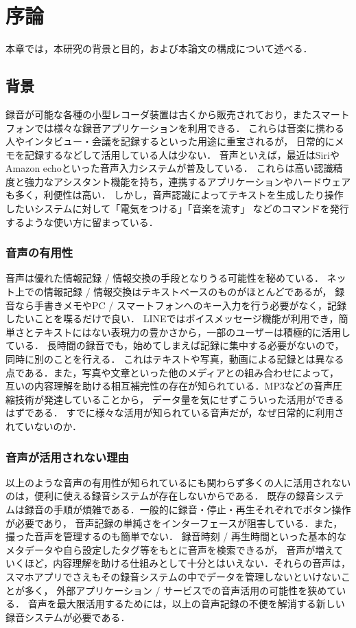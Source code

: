 \chapter{序論}
\label{chap:introduction}

本章では，本研究の背景と目的，および本論文の構成について述べる．

\newpage

\section{背景}

録音が可能な各種の小型レコーダ装置は古くから販売されており，またスマートフォンでは様々な録音アプリケーションを利用できる．
これらは音楽に携わる人やインタビュー・会議を記録するといった用途に重宝されるが，
日常的にメモを記録するなどして活用している人は少ない．
音声といえば，最近はSiriやAmazon echoといった音声入力システムが普及している．
これらは高い認識精度と強力なアシスタント機能を持ち，連携するアプリケーションやハードウェアも多く，利便性は高い．
しかし，音声認識によってテキストを生成したり操作したいシステムに対して「電気をつける」「音楽を流す」
などのコマンドを発行するような使い方に留まっている．

\subsection{音声の有用性}

音声は優れた情報記録 / 情報交換の手段となりうる可能性を秘めている．
ネット上での情報記録 / 情報交換はテキストベースのものがほとんどであるが，
録音なら手書きメモやPC / スマートフォンへのキー入力を行う必要がなく，記録したいことを喋るだけで良い．
LINEではボイスメッセージ機能が利用でき，簡単さとテキストにはない表現力の豊かさから，一部のユーザーは積極的に活用している．
長時間の録音でも，始めてしまえば記録に集中する必要がないので，同時に別のことを行える．
これはテキストや写真，動画による記録とは異なる点である．また，写真や文章といった他のメディアとの組み合わせによって，
互いの内容理解を助ける相互補完性の存在が知られている\cite{Nakakura}．MP3などの音声圧縮技術が発達していることから，
データ量を気にせずこういった活用ができるはずである．
すでに様々な活用が知られている音声だが，なぜ日常的に利用されていないのか．

\subsection{音声が活用されない理由}

以上のような音声の有用性が知られているにも関わらず多くの人に活用されないのは，便利に使える録音システムが存在しないからである．
既存の録音システムは録音の手順が煩雑である．一般的に録音・停止・再生それぞれでボタン操作が必要であり，
音声記録の単純さをインターフェースが阻害している．また，撮った音声を管理するのも簡単でない．
録音時刻 / 再生時間といった基本的なメタデータや自ら設定したタグ等をもとに音声を検索できるが，
音声が増えていくほど，内容理解を助ける仕組みとして十分とはいえない．それらの音声は，
スマホアプリでさえもその録音システムの中でデータを管理しないといけないことが多く，
外部アプリケーション / サービスでの音声活用の可能性を狭めている．
音声を最大限活用するためには，以上の音声記録の不便を解消する新しい録音システムが必要である．


